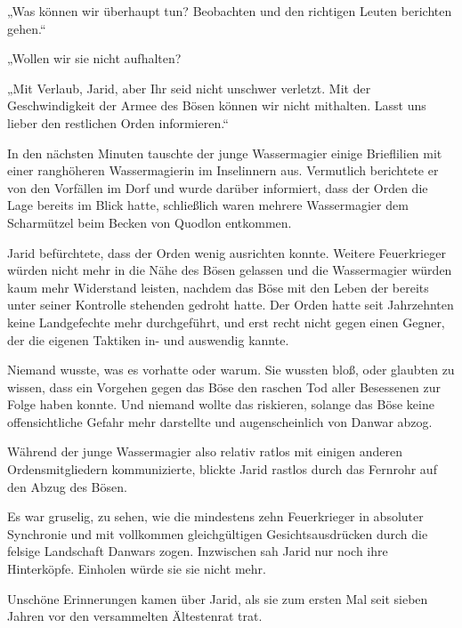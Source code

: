 „Was können wir überhaupt tun? Beobachten und den richtigen Leuten berichten gehen.“

„Wollen wir sie nicht aufhalten?

„Mit Verlaub, Jarid, aber Ihr seid nicht unschwer verletzt. Mit der Geschwindigkeit der Armee des Bösen können wir nicht mithalten. Lasst uns lieber den restlichen Orden informieren.“



\trennzeichen



In den nächsten Minuten tauschte der junge Wassermagier einige Brieflilien mit einer ranghöheren Wassermagierin im Inselinnern aus. Vermutlich berichtete er von den Vorfällen im Dorf und wurde darüber informiert, dass der Orden die Lage bereits im Blick hatte, schließlich waren mehrere Wassermagier dem Scharmützel beim Becken von Quodlon entkommen.

Jarid befürchtete, dass der Orden wenig ausrichten konnte. Weitere Feuerkrieger würden nicht mehr in die Nähe des Bösen gelassen und die Wassermagier würden kaum mehr Widerstand leisten, nachdem das Böse mit den Leben der bereits unter seiner Kontrolle stehenden gedroht hatte. Der Orden hatte seit Jahrzehnten keine Landgefechte mehr durchgeführt, und erst recht nicht gegen einen Gegner, der die eigenen Taktiken in- und auswendig kannte.

Niemand wusste, was es vorhatte oder warum. Sie wussten bloß, oder glaubten zu wissen, dass ein Vorgehen gegen das Böse den raschen Tod aller Besessenen zur Folge haben konnte. Und niemand wollte das riskieren, solange das Böse keine offensichtliche Gefahr mehr darstellte und augenscheinlich von Danwar abzog.

Während der junge Wassermagier also relativ ratlos mit einigen anderen Ordensmitgliedern kommunizierte, blickte Jarid rastlos durch das Fernrohr auf den Abzug des Bösen.

Es war gruselig, zu sehen, wie die mindestens zehn Feuerkrieger in absoluter Synchronie und mit vollkommen gleichgültigen Gesichtsausdrücken durch die felsige Landschaft Danwars zogen. Inzwischen sah Jarid nur noch ihre Hinterköpfe. Einholen würde sie sie nicht mehr.



\trennzeichen



Unschöne Erinnerungen kamen über Jarid, als sie zum ersten Mal seit sieben Jahren vor den versammelten Ältestenrat trat.

